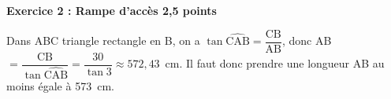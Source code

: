 \textbf{Exercice 2 : Rampe d'accès \hfill 2,5 points}

\medskip

%
%
Dans ABC  triangle rectangle en B, on a $\tan \widehat{\text{CAB}} = \dfrac{\text{CB}}{\text{AB}}$, donc AB $ =\dfrac{\text{CB}}{\tan \widehat{\text{CAB}}} = \dfrac{30}{\tan 3} \approx 572,43$~cm. Il faut donc prendre une longueur AB  au moins égale à 573~cm.
\vspace{0,5cm}

